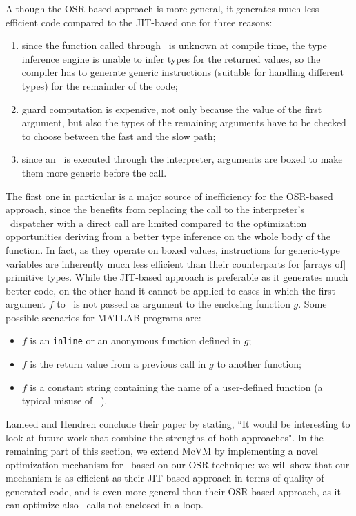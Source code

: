 Although the OSR-based approach is more general, it generates much less efficient code compared to the JIT-based one for three reasons:
\begin{enumerate}
\item since the function called through \feval\ is unknown at compile time, the type inference engine is unable to infer types for the returned values, so the compiler has to generate generic instructions (suitable for handling different types) for the remainder of the code;
\item guard computation is expensive, not only because the value of the first argument, but also the types of the remaining arguments have to be checked to choose between the fast and the slow path;
\item since an \feval\ is executed through the interpreter, arguments are boxed to make them more generic before the call.
\end{enumerate}

The first one in particular is a major source of inefficiency for the OSR-based approach, since the benefits from replacing the call to the interpreter's \feval\ dispatcher with a direct call are limited compared to the optimization opportunities deriving from a better type inference on the whole body of the function. In fact, as they operate on boxed values, instructions for generic-type variables are inherently much less efficient than their counterparts for [arrays of] primitive types. While the JIT-based approach is preferable as it generates much better code, on the other hand it cannot be applied to cases in which the first argument $f$ to \feval\ is not passed as argument to the enclosing function $g$. Some possible scenarios for MATLAB programs are:
\begin{itemize}
\item $f$ is an {\tt inline} or an anonymous function defined in $g$;
\item $f$ is the return value from a previous call in $g$ to another function;
\item $f$ is a constant string containing the name of a user-defined function (a typical misuse of \feval ~\cite{radpour2013refactoring}).
\end{itemize}
 
Lameed and Hendren conclude their paper by stating, ``It would be interesting to look at future work that combine the
strengths of both approaches". In the remaining part of this section, we extend McVM by implementing a novel optimization mechanism for \feval\ based on our OSR technique: we will show that our mechanism is as efficient as their JIT-based approach in terms of quality of generated code, and is even more general than their OSR-based approach, as it can optimize also \feval\ calls not enclosed in a loop.
\fi
